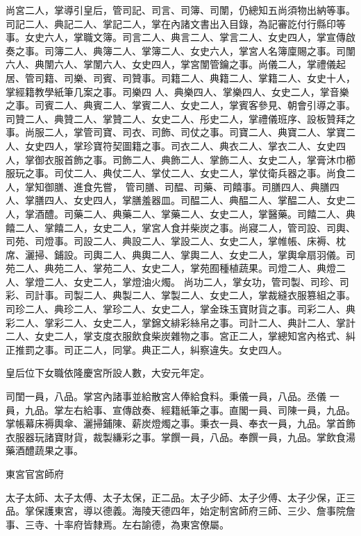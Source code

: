 \begin{pinyinscope}
 尚宮二人，掌導引皇后，管司記、司言、司簿、司闈，仍總知五尚須物出納等事。司記二人、典記二人、掌記二人，掌在內諸文書出入目錄，為記審訖付行縣印等事。女史六人，掌職文簿。司言二人、典言二人、掌言二人、女史四人，掌宣傳啟奏之事。司簿二人、典簿二人、掌簿二人、女史六人，掌宮人名簿廩賜之事。司闈六人、典闈六人、掌闈六人、女史四人，掌宮闈管鑰之事。尚儀二人，掌禮儀起居、管司籍、司樂、司賓、司贊事。司籍二人、典籍二人、掌籍二人、女史十人，掌經籍教學紙筆几案之事。司樂四
 人、典樂四人、掌樂四人、女史二人，掌音樂之事。司賓二人、典賓二人、掌賓二人、女史二人，掌賓客參見、朝會引導之事。司贊二人、典贊二人、掌贊二人、女史二人、彤史二人，掌禮儀班序、設板贊拜之事。尚服二人，掌管司寶、司衣、司飾、司仗之事。司寶二人、典寶二人、掌寶二人、女史四人，掌珍寶符契圖籍之事。司衣二人、典衣二人、掌衣二人、女史四人，掌御衣服首飾之事。司飾二人、典飾二人、掌飾二人、女史二人，掌膏沐巾櫛服玩之事。司仗二人、典仗二人、掌仗二人、女史二人，掌仗衛兵器之事。尚食二人，掌知御膳、進食先嘗，
 管司膳、司醖、司藥、司饎事。司膳四人、典膳四人、掌膳四人、女史四人，掌膳羞器皿。司醖二人、典醖二人、掌醖二人、女史二人，掌酒醴。司藥二人、典藥二人、掌藥二人、女史二人，掌醫藥。司饎二人、典饎二人、掌饎二人，女史二人，掌宮人食并柴炭之事。尚寢二人，管司設、司輿、司苑、司燈事。司設二人、典設二人、掌設二人、女史二人，掌帷帳、床褥、枕席、灑掃、鋪設。司輿二人、典輿二人、掌輿二人、女史二人，掌輿傘扇羽儀。司苑二人、典苑二人、掌苑二人、女史二人，掌苑囿種植蔬果。司燈二人、典燈二人、掌燈二人、女史二人，掌燈油火燭。
 尚功二人，掌女功，管司製、司珍、司彩、司計事。司製二人、典製二人、掌製二人、女史二人，掌裁縫衣服篡組之事。司珍二人、典珍二人、掌珍二人、女史二人，掌金珠玉寶財貨之事。司彩二人、典彩二人、掌彩二人、女史二人，掌錦文緋彩絲帛之事。司計二人、典計二人、掌計二人、女史二人，掌支度衣服飲食柴炭雜物之事。宮正二人，掌總知宮內格式、糾正推罰之事。司正二人，同掌。典正二人，糾察違失。女史四人。



 皇后位下女職依隆慶宮所設人數，大安元年定。



 司閨一員，八品。掌宮內諸事並給散宮人俸給食料。秉儀一員，八品。丞儀
 一員，九品。掌左右給事、宣傳啟奏、經籍紙筆之事。直閣一員、司陳一員，九品。掌帳幕床褥輿傘、灑掃鋪陳、薪炭燈燭之事。秉衣一員、奉衣一員，九品。掌首飾衣服器玩諸寶財貨，裁製縑彩之事。掌饌一員，八品。奉饌一員，九品。掌飲食湯藥酒醴蔬果之事。



 東宮官宮師府



 太子太師、太子太傅、太子太保，正二品。太子少師、太子少傅、太子少保，正三品。掌保護東宮，導以德義。海陵天德四年，始定制宮師府三師、三少、詹事院詹事、三寺、十率府皆隸焉。左右諭德，為東宮僚屬。




\end{pinyinscope}
